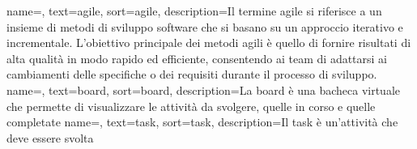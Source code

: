 {
    name=,
    text=agile,
    sort=agile,
    description={Il termine agile si riferisce a un insieme di metodi di sviluppo software che si basano su un approccio iterativo e incrementale. 
    L'obiettivo principale dei metodi agili è quello di fornire risultati di alta qualità in modo rapido ed efficiente, consentendo ai team di adattarsi ai cambiamenti delle specifiche o dei requisiti durante il processo di sviluppo.}
}
{
    name=,
    text=board,
    sort=board,
    description={La board è una bacheca virtuale che permette di visualizzare le attività da svolgere, quelle in corso e quelle completate}
}
{
    name=,
    text=task,
    sort=task,
    description={Il task è un'attività che deve essere svolta}
}


